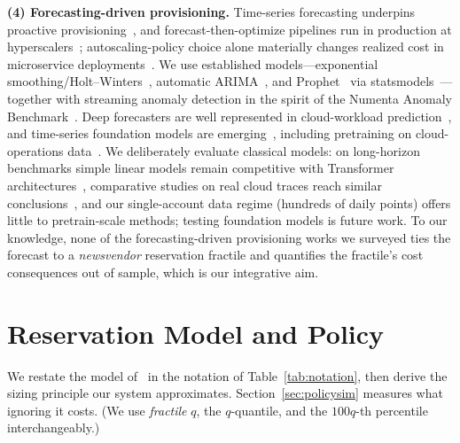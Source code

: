 \documentclass[10pt,journal]{IEEEtran}
\begin{document}
\textbf{(4) Forecasting-driven provisioning.}
Time-series forecasting underpins proactive
provisioning~\cite{kirchoff2024provisioning,agullo2025forecasting,pintye2024autoscaling,ahmad2025autoscaling},
and forecast-then-optimize pipelines run in production at
hyperscalers~\cite{zou2024optscaler,wang2022deepscaling};
autoscaling-policy choice alone materially changes realized cost in
microservice deployments~\cite{sachidananda2024erlang}. We use established
models---exponential smoothing/Holt--Winters~\cite{winters1960holtwinters,hyndman2021fpp},
automatic ARIMA~\cite{hyndman2008forecast}, and
Prophet~\cite{taylor2018prophet} via
statsmodels~\cite{seabold2010statsmodels}---together with streaming anomaly
detection in the spirit of the Numenta Anomaly
Benchmark~\cite{ahmad2017nab}. Deep forecasters are well
represented in cloud-workload prediction~\cite{xu2022esdnn,chen2025fremer},
and time-series foundation models are
emerging~\cite{ansari2024chronos,das2024timesfm,woo2024moirai}, including
pretraining on cloud-operations data~\cite{woo2023cloudops}. We deliberately
evaluate classical models: on long-horizon benchmarks simple linear models
remain competitive with Transformer
architectures~\cite{zeng2023transformers}, comparative studies on real cloud
traces reach similar conclusions~\cite{lackinger2024cloudworkloads}, and our
single-account data regime (hundreds of daily points) offers little to
pretrain-scale methods; testing foundation models is future work. To our
knowledge, none of the forecasting-driven provisioning works we surveyed
ties the forecast to a \emph{newsvendor} reservation fractile and quantifies
the fractile's cost consequences out of sample, which is our integrative aim.

\section{Reservation Model and Policy}\label{sec:model}
We restate the model of~\cite{chen2024capacity} in the notation of
Table~\ref{tab:notation}, then derive the sizing principle our system
approximates. Section~\ref{sec:policysim} measures what ignoring it costs.
(We use \emph{fractile} $q$, the $q$-quantile, and the $100q$-th percentile
interchangeably.)
\end{document}
